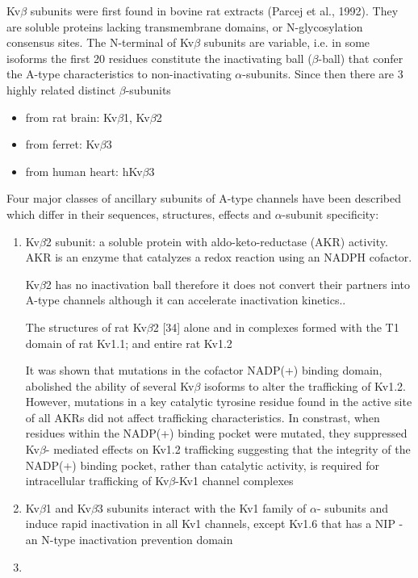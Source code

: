 Kv$\beta$ subunits were first found in bovine rat extracts (Parcej et al.,
1992). They are soluble proteins lacking transmembrane domains, or
N-glycosylation consensus sites. The N-terminal of Kv$\beta$ subunits are
variable, i.e. in some isoforms the first 20 residues constitute the
inactivating ball ($\beta$-ball) that confer the A-type characteristics to
non-inactivating $\alpha$-subunits. 
Since then there are 3 highly related distinct $\beta$-subunits 
\begin{itemize}
  \item from rat brain: Kv$\beta$1, Kv$\beta$2
  
  \item from ferret: Kv$\beta$3
  
  \item from human heart: hKv$\beta$3
\end{itemize}

Four major classes of ancillary subunits of A-type channels have been described
which differ in their sequences, structures, effects and $\alpha$-subunit
specificity:

\begin{enumerate}
  \item Kv$\beta$2 subunit: a soluble protein with aldo-keto-reductase (AKR)
  activity. AKR is an enzyme that catalyzes a redox reaction using an NADPH
  cofactor. 
  
  Kv$\beta$2 has no inactivation ball therefore it does not convert their partners
  into A-type channels although it can accelerate inactivation kinetics..
  
  The structures of rat Kv$\beta$2 [34] alone and in complexes formed with the T1
  domain of rat Kv1.1; and entire rat Kv1.2 

  It was shown that mutations in the cofactor NADP(+) binding domain,
abolished the ability of several Kv$\beta$ isoforms to alter the trafficking of
Kv1.2.
However, mutations in a key catalytic tyrosine residue found in the active site
of all AKRs did not affect trafficking characteristics. In constrast,  when
residues within the NADP(+) binding pocket were mutated, they suppressed Kv$\beta$-
mediated effects on Kv1.2 trafficking suggesting that the integrity
of the NADP(+) binding pocket, rather than catalytic activity, is
required for intracellular trafficking of Kv$\beta$-Kv1 channel complexes

  \item Kv$\beta$1 and Kv$\beta$3 subunits interact with the Kv1 family of $\alpha$-
subunits and induce rapid inactivation in all Kv1 channels, except Kv1.6 that
has a NIP - an N-type inactivation prevention domain
  
  \item 
\end{enumerate}


